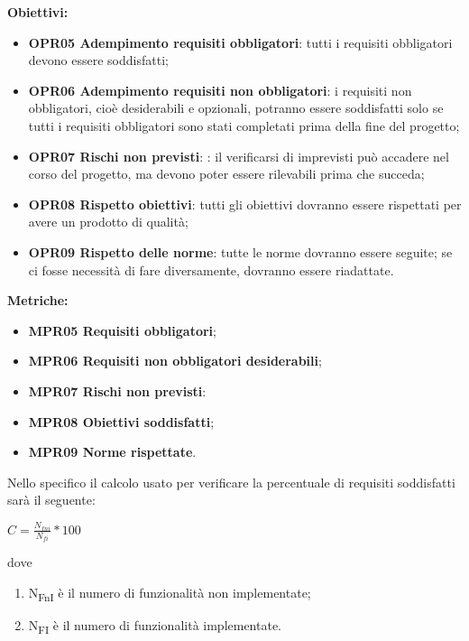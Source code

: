 \documentclass[../piano_di_qualifica.tex]{subfiles}
\begin{document}
\textbf{Obiettivi:}
\smallbreak
\begin{itemize}
	\item \textbf{OPR05 Adempimento requisiti obbligatori}: tutti i requisiti obbligatori devono essere soddisfatti;
	\item \textbf{OPR06 Adempimento requisiti non obbligatori}: i requisiti non obbligatori, cioè desiderabili e opzionali, potranno essere soddisfatti solo se tutti i requisiti obbligatori sono stati completati prima della fine del progetto;
	\item \textbf{OPR07 Rischi non previsti}: : il verificarsi di imprevisti può accadere nel corso del progetto, ma devono poter essere rilevabili prima che succeda;
	\item \textbf{OPR08 Rispetto obiettivi}: tutti gli obiettivi dovranno essere rispettati per avere un prodotto di qualità;
	\item \textbf{OPR09 Rispetto delle norme}: tutte le norme dovranno essere seguite; se ci fosse necessità di fare diversamente, dovranno essere riadattate.
\end{itemize}

\textbf{Metriche:}
\smallbreak
\begin{itemize}
	\item \textbf{MPR05 Requisiti obbligatori};
	\item \textbf{MPR06 Requisiti non obbligatori desiderabili};
	\item \textbf{MPR07 Rischi non previsti}: 
	\item \textbf{MPR08 Obiettivi soddisfatti};
	\item \textbf{MPR09 Norme rispettate}.
\end{itemize}

Nello specifico il calcolo usato per verificare la percentuale di requisiti soddisfatti sarà il seguente: \par
\begin{center}
	$C = \frac{N_{fni}}{N_{fi}} * 100$
\end{center}

dove
\begin{enumerate}
	\item N\textsubscript{FnI} è il numero di funzionalità non implementate;
	\item N\textsubscript{FI} è il numero di funzionalità implementate.
\end{enumerate}
\end{document}
